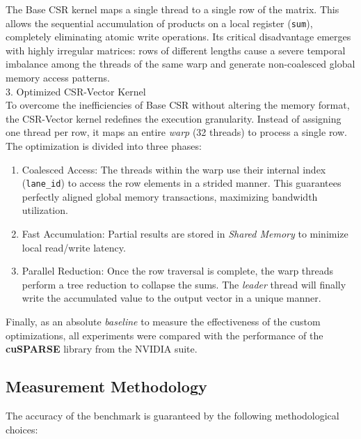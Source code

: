 \documentclass[conference]{IEEEtran}
\begin{document}
The Base CSR kernel maps a single thread to a single row of the matrix. This allows the sequential accumulation of products on a local register (\texttt{sum}), completely eliminating atomic write operations. Its critical disadvantage emerges with highly irregular matrices: rows of different lengths cause a severe temporal imbalance among the threads of the same warp and generate non-coalesced global memory access patterns.\\

3. Optimized CSR-Vector Kernel\\
To overcome the inefficiencies of Base CSR without altering the memory format, the CSR-Vector kernel redefines the execution granularity. Instead of assigning one thread per row, it maps an entire \textit{warp} (32 threads) to process a single row. The optimization is divided into three phases:
\begin{enumerate}
    \item Coalesced Access: The threads within the warp use their internal index (\texttt{lane\_id}) to access the row elements in a strided manner. This guarantees perfectly aligned global memory transactions, maximizing bandwidth utilization.
    \item Fast Accumulation: Partial results are stored in \textit{Shared Memory} to minimize local read/write latency.
    \item Parallel Reduction: Once the row traversal is complete, the warp threads perform a tree reduction to collapse the sums. The \textit{leader} thread will finally write the accumulated value to the output vector in a unique manner.
\end{enumerate}

Finally, as an absolute \textit{baseline} to measure the effectiveness of the custom optimizations, all experiments were compared with the performance of the \textbf{cuSPARSE} library from the NVIDIA suite.
\subsection{Measurement Methodology}
The accuracy of the benchmark is guaranteed by the following methodological choices:
\end{document}
